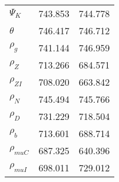\begin{center}
\begin{longtable}{lcc}
$ {\Psi_{K}}           $	 & 	     743.853	 & 	     744.778 \\ 
$ {\theta}             $	 & 	     746.417	 & 	     746.712 \\ 
$ {\rho_g}             $	 & 	     741.144	 & 	     746.959 \\ 
$ {\rho_Z}             $	 & 	     713.266	 & 	     684.571 \\ 
$ {\rho_{ZI}}          $	 & 	     708.020	 & 	     663.842 \\ 
$ {\rho_N}             $	 & 	     745.494	 & 	     745.766 \\ 
$ {\rho_D}             $	 & 	     731.229	 & 	     718.504 \\ 
$ {\rho_b}             $	 & 	     713.601	 & 	     688.714 \\ 
$ {\rho_{muC}}         $	 & 	     687.325	 & 	     640.396 \\ 
$ {\rho_{muI}}         $	 & 	     698.011	 & 	     729.012 \\ 
\end{longtable}
 \end{center}
